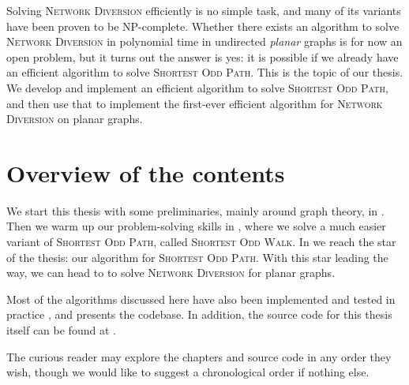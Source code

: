 Solving \textsc{Network Diversion} efficiently is no simple task, and many of its variants have been proven to be NP-complete. Whether there exists an algorithm to solve \textsc{Network Diversion} in polynomial time in undirected \emph{planar} graphs is for now an open problem, but it turns out the answer is yes: it is possible if we already have an efficient algorithm to solve \textsc{Shortest Odd Path}. This is the topic of our thesis. We develop and implement an efficient algorithm to solve \textsc{Shortest Odd Path}, and then use that to implement the first-ever efficient algorithm for \textsc{Network Diversion} on planar graphs.

\section*{Overview of the contents}
We start this thesis with some preliminaries, mainly around graph theory, in . Then we warm up our problem-solving skills in , where we solve a much easier variant of \textsc{Shortest Odd Path}, called \textsc{Shortest Odd Walk}. In  we reach the star of the thesis: our algorithm for \textsc{Shortest Odd Path}. With this star leading the way, we can head to  to solve \textsc{Network Diversion} for planar graphs. 

Most of the algorithms discussed here have also been implemented and tested in practice \cite{source:codebase}, and  presents the codebase. In addition, the source code for this thesis itself can be found at \cite{source:thesis}.

The curious reader may explore the chapters and source code in any order they wish, though we would like to suggest a chronological order if nothing else.
